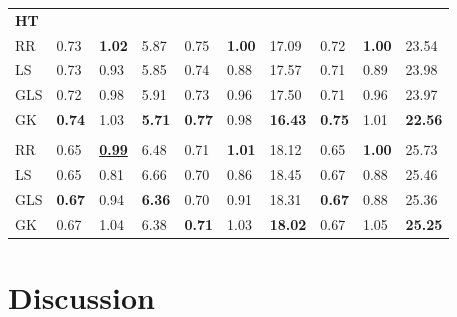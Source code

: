 \begin{table}
\begin{tabular}{llllllllll}
\multicolumn{10}{l}{\textbf{HT}}\\
\hspace{1em}RR & 0.73 & \textbf{1.02} & 5.87 & 0.75 & \textbf{1.00} & 17.09 & 0.72 & \textbf{1.00} & 23.54\\
\hspace{1em}LS & 0.73 & 0.93 & 5.85 & 0.74 & 0.88 & 17.57 & 0.71 & 0.89 & 23.98\\
\hspace{1em}GLS & 0.72 & 0.98 & 5.91 & 0.73 & 0.96 & 17.50 & 0.71 & 0.96 & 23.97\\
\hspace{1em}GK & \textbf{0.74} & 1.03 & \textbf{5.71} & \textbf{0.77} & 0.98 & \textbf{16.43} & \textbf{0.75} & 1.01 & \textbf{22.56}\\
\addlinespace[0.3em]
\multicolumn{10}{l}{\textbf{IBD}}\\
\hspace{1em}RR & 0.65 & \underline{\textbf{0.99}} & 6.48 & 0.71 & \textbf{1.01} & 18.12 & 0.65 & \textbf{1.00} & 25.73\\
\hspace{1em}LS & 0.65 & 0.81 & 6.66 & 0.70 & 0.86 & 18.45 & 0.67 & 0.88 & 25.46\\
\hspace{1em}GLS & \textbf{0.67} & 0.94 & \textbf{6.36} & 0.70 & 0.91 & 18.31 & \textbf{0.67} & 0.88 & 25.36\\
\hspace{1em}GK & 0.67 & 1.04 & 6.38 & \textbf{0.71} & 1.03 & \textbf{18.02} & 0.67 & 1.05 & \textbf{25.25}\\
\bottomrule
\end{tabular}
\end{table}

\hypertarget{discussion}{%
\section{Discussion}\label{discussion}}

